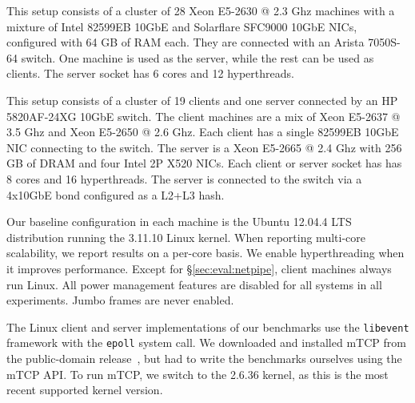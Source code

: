 
 
 This setup consists of a
cluster of 28 Xeon E5-2630 @ 2.3 Ghz machines with a mixture of
Intel 82599EB 10GbE and Solarflare SFC9000 10GbE NICs, configured
with 64 GB of RAM each. They are connected with an Arista 7050S-64
switch. One machine is used as the server, while the rest can be used
as clients. The server socket has 6 cores and 12 hyperthreads.

 This setup consists of a cluster of 19
clients and one server connected by an HP 5820AF-24XG 10GbE switch.
The client machines are a mix of Xeon E5-2637 @ 3.5 Ghz and Xeon
E5-2650 @ 2.6 Ghz.  Each client has a single 82599EB 10GbE NIC
connecting to the switch.  The server is a Xeon E5-2665 @ 2.4 Ghz with
256 GB of DRAM and four Intel 2P X520 NICs.  Each client or server
socket has has 8 cores and 16 hyperthreads.  The server is connected
to the switch via a 4x10GbE bond configured as a L2+L3 hash.

 Our baseline configuration in each
machine is the Ubuntu 12.04.4 LTS distribution running the 3.11.10
Linux kernel.  When reporting multi-core scalability, we report
results on a per-core basis. We enable hyperthreading when it improves performance. Except for
\S\ref{sec:eval:netpipe}, client machines always run Linux. All power
management features are disabled for all systems in all
experiments. Jumbo frames are never enabled.




%

%


The Linux client and server implementations of our benchmarks use the
\texttt{libevent} framework with the \texttt{epoll} system call.  We
downloaded and installed mTCP from the public-domain
release~\cite{url:mtcp}, but had to write the benchmarks ourselves
using the mTCP API.  To run mTCP, we switch to the 2.6.36 kernel, as
this is the most recent supported kernel version.

